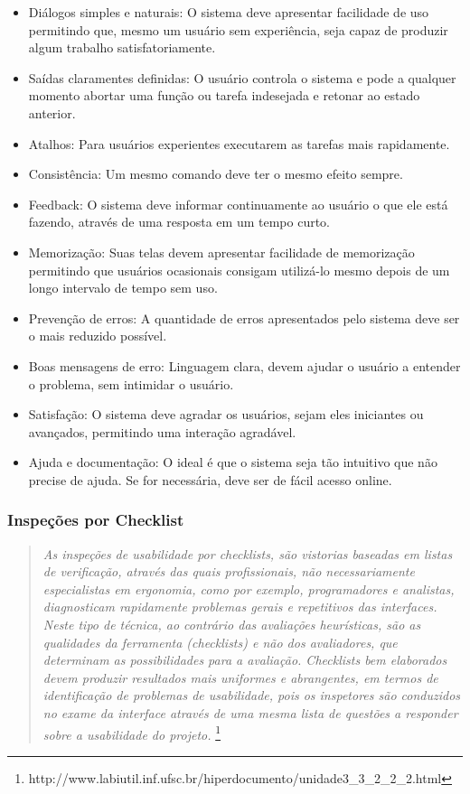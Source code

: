 \begin{itemize}
  \item Diálogos simples e naturais: O sistema deve apresentar facilidade de uso permitindo que, mesmo um usuário sem experiência, seja capaz de produzir algum trabalho satisfatoriamente.
  \item Saídas claramentes definidas: O usuário controla o sistema e pode a qualquer momento abortar uma função ou tarefa indesejada e retonar ao estado anterior.
  \item Atalhos: Para usuários experientes executarem as tarefas mais rapidamente.
  \item Consistência: Um mesmo comando deve ter o mesmo efeito sempre. 
  \item Feedback: O sistema deve informar continuamente ao usuário o que ele está fazendo, através de uma resposta em um tempo curto.
  \item Memorização: Suas telas devem apresentar facilidade de memorização permitindo que usuários ocasionais consigam utilizá-lo mesmo depois de um longo intervalo de tempo sem uso.
  \item Prevenção de erros: A quantidade de erros apresentados pelo sistema deve ser o mais reduzido possível.
  \item Boas mensagens de erro: Linguagem clara, devem ajudar o usuário a entender o problema, sem intimidar o usuário.
  \item Satisfação: O sistema deve agradar os usuários, sejam eles iniciantes ou avançados, permitindo uma interação agradável.
  \item Ajuda e documentação: O ideal é que o sistema seja tão intuitivo que não precise de ajuda. Se for necessária, deve ser de fácil acesso online.
\end{itemize}


\subsubsection{Inspeções por Checklist}

\begin{quote}
\emph{As inspeções de usabilidade por checklists, são vistorias baseadas em listas de verificação, através das quais profissionais, não necessariamente especialistas em ergonomia, como por exemplo, programadores e analistas, diagnosticam rapidamente problemas gerais e repetitivos das interfaces. Neste tipo de técnica, ao contrário das avaliações heurísticas, são as qualidades da ferramenta (checklists) e não dos avaliadores, que determinam as possibilidades para a avaliação. Checklists bem elaborados devem produzir resultados mais uniformes e abrangentes, em termos de identificação de problemas de usabilidade, pois os inspetores são conduzidos no exame da interface através de uma mesma lista de questões a responder sobre a usabilidade do projeto.}
\cite{cybil_apostila}\footnote{http://www.labiutil.inf.ufsc.br/hiperdocumento/unidade3_3_2_2_2.html}
\end{quote} 

